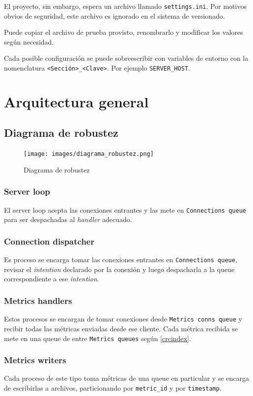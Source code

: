 \documentclass[titlepage,a4paper,oneside]{article}
\begin{document}
El proyecto, sin embargo, espera un archivo llamado \texttt{settings.ini}. Por motivos obvios de seguridad, este archivo es ignorado en el sistema de versionado.

Puede copiar el archivo de prueba provisto, renombrarlo y modificar los valores según necesidad.

Cada posible configuración se puede sobreescribir con variables de entorno con la nomenclatura \texttt{<Sección>\_<Clave>}. Por ejemplo \texttt{SERVER\_HOST}.

\section{Arquitectura general}
\subsection{Diagrama de robustez} \label{robustez}
\begin{figure}[H]
\centering
\texttt{[image: images/diagrama\_robustez.png]}
\caption{Diagrama de robustez}
\end{figure}

\subsubsection{Server loop}
El server loop acepta las conexiones entrantes y las mete en \texttt{Connections queue} para ser despachadas al \textit{handler} adecuado.

\subsubsection{Connection dispatcher}
Es proceso se encarga tomar las conexiones entrantes en \texttt{Connections queue}, revisar el \textit{intention} declarado por la conexión y luego despacharla a la queue correspondiente a ese \textit{intention}.

\subsubsection{Metrics handlers}
Estos procesos se encargan de tomar conexiones desde \texttt{Metrics conns queue} y recibir todas las métricas enviadas desde ese cliente. Cada métrica recibida se mete en una queue de entre \texttt{Metrics queues} según \eqref{crcindex}.

\subsubsection{Metrics writers}
Cada proceso de este tipo toma métricas de una queue en particular y se encarga de escribirlas a archivos, particionando por \texttt{metric\_id} y por \texttt{timestamp}.
\end{document}
